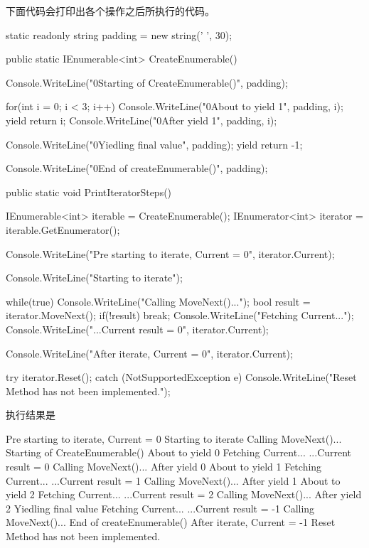 下面代码会打印出各个操作之后所执行的代码。

\begin{CSharp}
        static readonly string padding = new string(' ', 30);

        public static IEnumerable<int> CreateEnumerable()
        {
            Console.WriteLine("{0}Starting of CreateEnumerable()", padding);

            for(int i = 0; i < 3; i++)
            {
                Console.WriteLine("{0}About to yield {1}", padding, i);
                yield return i;
                Console.WriteLine("{0}After yield {1}", padding, i);
            }

            Console.WriteLine("{0}Yiedling final value", padding);
            yield return -1;

            Console.WriteLine("{0}End of createEnumerable()", padding);
        }

        public static void PrintIteratorSteps()
        {
            IEnumerable<int> iterable = CreateEnumerable();
            IEnumerator<int> iterator = iterable.GetEnumerator();


            Console.WriteLine("Pre starting to iterate, Current = {0}", iterator.Current);

            Console.WriteLine("Starting to iterate");

            while(true)
            {
                Console.WriteLine("Calling MoveNext()...");
                bool result = iterator.MoveNext();
                if(!result)
                {
                    break;
                }
                Console.WriteLine("Fetching Current...");
                Console.WriteLine("...Current result = {0}", iterator.Current);
            }

            Console.WriteLine("After iterate, Current = {0}", iterator.Current);

            try
            {
                iterator.Reset();
            }
            catch (NotSupportedException e)
            {
                Console.WriteLine("Reset Method has not been implemented.");
            }
        }
\end{CSharp}

执行结果是
\begin{CSharp}
Pre starting to iterate, Current = 0
Starting to iterate
Calling MoveNext()...
                              Starting of CreateEnumerable()
                              About to yield 0
Fetching Current...
...Current result = 0
Calling MoveNext()...
                              After yield 0
                              About to yield 1
Fetching Current...
...Current result = 1
Calling MoveNext()...
                              After yield 1
                              About to yield 2
Fetching Current...
...Current result = 2
Calling MoveNext()...
                              After yield 2
                              Yiedling final value
Fetching Current...
...Current result = -1
Calling MoveNext()...
                              End of createEnumerable()
After iterate, Current = -1
Reset Method has not been implemented.
\end{CSharp}
